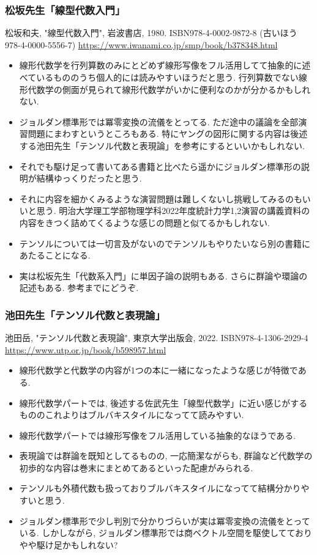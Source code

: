 \documentclass[10pt,a4paper]{jsarticle}
\begin{document}
\subsubsection*{松坂先生「線型代数入門」}
松坂和夫, "線型代数入門", 岩波書店, 1980. ISBN978-4-0002-9872-8 (古いほう 978-4-0000-5556-7) \url{https://www.iwanami.co.jp/smp/book/b378348.html}
\begin{itemize}
    \item 線形代数学を行列算数のみにとどめず線形写像をフル活用してて抽象的に述べているもののうち個人的には読みやすいほうだと思う. 行列算数でない線形代数学の側面が見られて線形代数学がいかに便利なのかが分かるかもしれない. 
    \item ジョルダン標準形では冪零変換の流儀をとってる. ただ途中の議論を全部演習問題にまわすというところもある. 特にヤングの図形に関する内容は後述する池田先生「テンソル代数と表現論」を参考にするといいかもしれない. 
    \item それでも駆け足って書いてある書籍と比べたら遥かにジョルダン標準形の説明が結構ゆっくりだったと思う. 
    \item それに内容を細かくみるような演習問題は難しくないし挑戦してみるのもいいと思う. 明治大学理工学部物理学科2022年度統計力学1,2演習の講義資料の内容をきつく詰めてくるような感じの問題と似てるかもしれない. 
    \item テンソルについては一切言及がないのでテンソルもやりたいなら別の書籍にあたることになる. 
    \item 実は松坂先生「代数系入門」に単因子論の説明もある. さらに群論や環論の記述もある. 参考までにどうぞ. 
\end{itemize}
\subsubsection*{池田先生「テンソル代数と表現論」}
池田岳, "テンソル代数と表現論", 東京大学出版会, 2022. ISBN978-4-1306-2929-4 \url{https://www.utp.or.jp/book/b598957.html}
\begin{itemize}
    \item 線形代数学と代数学の内容が1つの本に一緒になったような感じが特徴である. 
    \item 線形代数学パートでは, 後述する佐武先生「線型代数学」に近い感じがするもののこれよりはブルバキスタイルになってて読みやすい. 
    \item 線形代数学パートでは線形写像をフル活用している抽象的なほうである. 
    \item 表現論では群論を既知としてるものの, 一応簡潔ながらも, 群論など代数学の初歩的な内容は巻末にまとめてあるといった配慮がみられる. 
    \item テンソルも外積代数も扱っておりブルバキスタイルになってて結構分かりやすいと思う. 
    \item ジョルダン標準形で少し判別で分かりづらいが実は冪零変換の流儀をとっている. しかしながら, ジョルダン標準形では商ベクトル空間を駆使してておりやや駆け足かもしれない? 
\end{itemize}
\end{document}
